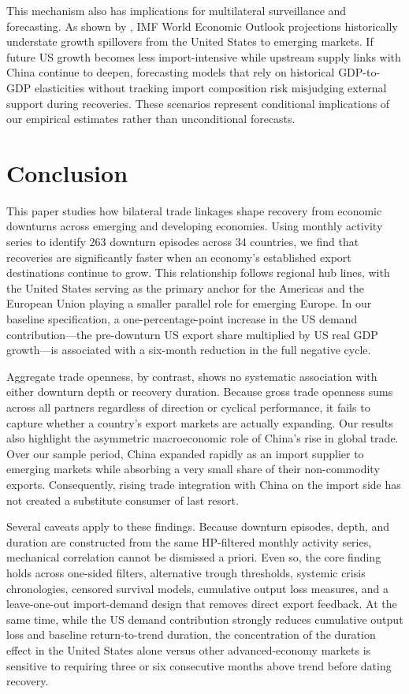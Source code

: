 \documentclass[12pt, a4paper]{article}
\begin{document}
This mechanism also has implications for multilateral surveillance and forecasting. As shown by \citet{sholomytskyi2026}, IMF World Economic Outlook projections historically understate growth spillovers from the United States to emerging markets. If future US growth becomes less import-intensive while upstream supply links with China continue to deepen, forecasting models that rely on historical GDP-to-GDP elasticities without tracking import composition risk misjudging external support during recoveries. These scenarios represent conditional implications of our empirical estimates rather than unconditional forecasts.

\section{Conclusion}\label{sec:conclusion}

This paper studies how bilateral trade linkages shape recovery from economic downturns across emerging and developing economies. Using monthly activity series to identify 263 downturn episodes across 34 countries, we find that recoveries are significantly faster when an economy's established export destinations continue to grow. This relationship follows regional hub lines, with the United States serving as the primary anchor for the Americas and the European Union playing a smaller parallel role for emerging Europe. In our baseline specification, a one-percentage-point increase in the US demand contribution---the pre-downturn US export share multiplied by US real GDP growth---is associated with a six-month reduction in the full negative cycle.

Aggregate trade openness, by contrast, shows no systematic association with either downturn depth or recovery duration. Because gross trade openness sums across all partners regardless of direction or cyclical performance, it fails to capture whether a country's export markets are actually expanding. Our results also highlight the asymmetric macroeconomic role of China's rise in global trade. Over our sample period, China expanded rapidly as an import supplier to emerging markets while absorbing a very small share of their non-commodity exports. Consequently, rising trade integration with China on the import side has not created a substitute consumer of last resort.

Several caveats apply to these findings. Because downturn episodes, depth, and duration are constructed from the same HP-filtered monthly activity series, mechanical correlation cannot be dismissed a priori. Even so, the core finding holds across one-sided filters, alternative trough thresholds, systemic crisis chronologies, censored survival models, cumulative output loss measures, and a leave-one-out import-demand design that removes direct export feedback. At the same time, while the US demand contribution strongly reduces cumulative output loss and baseline return-to-trend duration, the concentration of the duration effect in the United States alone versus other advanced-economy markets is sensitive to requiring three or six consecutive months above trend before dating recovery.
\end{document}
